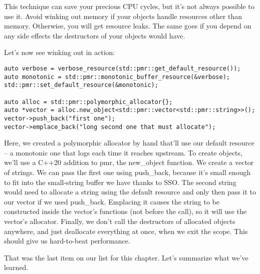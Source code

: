 This technique can save your precious CPU cycles, but it's not always possible to use it. Avoid winking out memory if your objects handle resources other than memory. Otherwise, you will get resource leaks. The same goes if you depend on any side effects the destructors of your objects would have.

Let's now see winking out in action:

\begin{lstlisting}[style=styleCXX]
auto verbose = verbose_resource(std::pmr::get_default_resource());
auto monotonic = std::pmr::monotonic_buffer_resource(&verbose);
std::pmr::set_default_resource(&monotonic);

auto alloc = std::pmr::polymorphic_allocator{};
auto *vector = alloc.new_object<std::pmr::vector<std::pmr::string>>();
vector->push_back("first one");
vector->emplace_back("long second one that must allocate");
\end{lstlisting}

Here, we created a polymorphic allocator by hand that'll use our default resource – a monotonic one that logs each time it reaches upstream. To create objects, we'll use a C++20 addition to pmr, the new\_object function. We create a vector of strings. We can pass the first one using push\_back, because it's small enough to fit into the small-string buffer we have thanks to SSO. The second string would need to allocate a string using the default resource and only then pass it to our vector if we used push\_back. Emplacing it causes the string to be constructed inside the vector's functions (not before the call), so it will use the vector's allocator. Finally, we don't call the destructors of allocated objects anywhere, and just deallocate everything at once, when we exit the scope. This should give us hard-to-beat performance.

That was the last item on our list for this chapter. Let's summarize what we've learned.














 